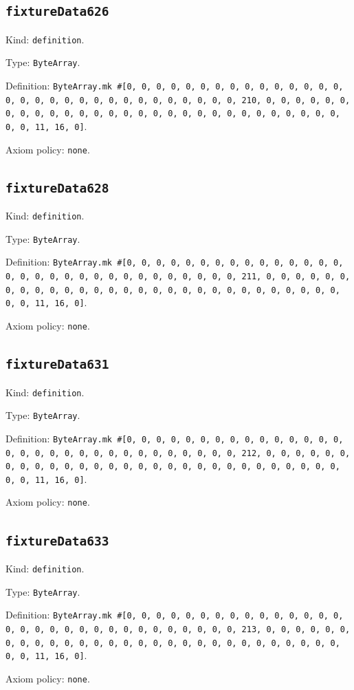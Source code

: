 \documentclass[11pt]{article}
\begin{document}
\subsection*{\texttt{fixtureData626}}
\noindent Kind: \texttt{definition}.\par
\noindent Type: \texttt{ByteArray}.\par
\noindent Definition: \texttt{ByteArray.mk \#[0, 0, 0, 0, 0, 0, 0, 0, 0, 0, 0, 0, 0, 0, 0, 0, 0, 0, 0, 0, 0, 0, 0, 0, 0, 0, 0, 0, 0, 0, 0, 210, 0, 0, 0, 0, 0, 0, 0, 0, 0, 0, 0, 0, 0, 0, 0, 0, 0, 0, 0, 0, 0, 0, 0, 0, 0, 0, 0, 0, 0, 0, 0, 11, 16, 0]}.\par
\noindent Axiom policy: \texttt{none}.\par
\subsection*{\texttt{fixtureData628}}
\noindent Kind: \texttt{definition}.\par
\noindent Type: \texttt{ByteArray}.\par
\noindent Definition: \texttt{ByteArray.mk \#[0, 0, 0, 0, 0, 0, 0, 0, 0, 0, 0, 0, 0, 0, 0, 0, 0, 0, 0, 0, 0, 0, 0, 0, 0, 0, 0, 0, 0, 0, 0, 211, 0, 0, 0, 0, 0, 0, 0, 0, 0, 0, 0, 0, 0, 0, 0, 0, 0, 0, 0, 0, 0, 0, 0, 0, 0, 0, 0, 0, 0, 0, 0, 11, 16, 0]}.\par
\noindent Axiom policy: \texttt{none}.\par
\subsection*{\texttt{fixtureData631}}
\noindent Kind: \texttt{definition}.\par
\noindent Type: \texttt{ByteArray}.\par
\noindent Definition: \texttt{ByteArray.mk \#[0, 0, 0, 0, 0, 0, 0, 0, 0, 0, 0, 0, 0, 0, 0, 0, 0, 0, 0, 0, 0, 0, 0, 0, 0, 0, 0, 0, 0, 0, 0, 212, 0, 0, 0, 0, 0, 0, 0, 0, 0, 0, 0, 0, 0, 0, 0, 0, 0, 0, 0, 0, 0, 0, 0, 0, 0, 0, 0, 0, 0, 0, 0, 11, 16, 0]}.\par
\noindent Axiom policy: \texttt{none}.\par
\subsection*{\texttt{fixtureData633}}
\noindent Kind: \texttt{definition}.\par
\noindent Type: \texttt{ByteArray}.\par
\noindent Definition: \texttt{ByteArray.mk \#[0, 0, 0, 0, 0, 0, 0, 0, 0, 0, 0, 0, 0, 0, 0, 0, 0, 0, 0, 0, 0, 0, 0, 0, 0, 0, 0, 0, 0, 0, 0, 213, 0, 0, 0, 0, 0, 0, 0, 0, 0, 0, 0, 0, 0, 0, 0, 0, 0, 0, 0, 0, 0, 0, 0, 0, 0, 0, 0, 0, 0, 0, 0, 11, 16, 0]}.\par
\noindent Axiom policy: \texttt{none}.\par
\end{document}
